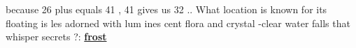 \documentclass{article}
\begin{document}
\begin{minipage}{0.48\linewidth}
\begin{tcolorbox}
\textcolor{red!50!black}{ because}   26 \textcolor{red!50!black}{ plus} \wavyuline{ }  \textcolor{red!50!black}{ equals} \wavyuline{ } 41 ,  \wavyuline{\textcolor{red!50!black}{ subtract}}  \wavyuline{ }   \wavyuline{ } 41  gives  us \wavyuline{ } 32 \textcolor{red!50!black}{..} \textcolor{red!50!black}{ What} \textcolor{red!50!black}{ location}  is \textcolor{red!50!black}{ known}  for  its \textcolor{red!50!black}{ floating} \textcolor{red!50!black}{ is} les \textcolor{red!50!black}{ adorned}  with  lum ines cent  flora \textcolor{red!50!black}{ and}  crystal -clear  water falls \textcolor{red!50!black}{ that} \textcolor{red!50!black}{ whisper}  secrets \textcolor{red!50!black}{?:} \textbf{\textcolor{green!50!black}{\underline{ frost}}}   %
            \end{tcolorbox}
            
                \end{minipage}
                \hfill
\end{document}
